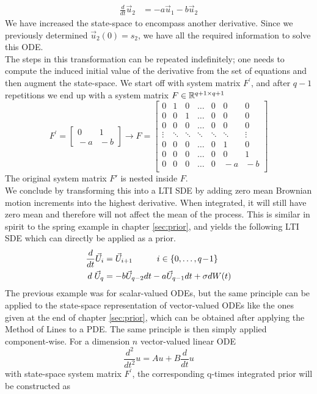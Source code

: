 {\begin{align}
    \frac{d}{dt}\vec{u}_2 &= -a\vec{u}_{1} - b\vec{u}_{2}
\end{align}
We have increased the state-space to encompass another derivative. Since we previously determined $\vec{u}_2(0) = s_2$, we have all the required information to solve this ODE.
\\ The steps in this transformation can be repeated indefinitely; one needs to compute the induced initial value of the derivative from the set of equations and then augment the state-space.
We start off with system matrix $F^\prime$, and after $q-1$ repetitions we end up with a system matrix $F\in\mathbb{R}^{q+1\times q+1}$ 
$$F^\prime\!\! =\! \begin{bmatrix}
0 & 1 \\  \!-a & \!-b
\end{bmatrix} \to F =\! \begin{bmatrix}
0 & 1 & 0 & \!\!\dots\!\! & 0 & 0 & 0 \\
0 & 0 & 1 & \!\!\dots\!\! & 0 & 0 & 0 \\
0 & 0 & 0 & \!\!\dots\!\! & 0 & 0 & 0 \\
\vdots & \!\!\ddots\!\! & \!\!\ddots\!\! & \!\!\ddots\!\! & \!\!\ddots\!\! & \!\!\ddots\!\! & \vdots \\
0 & 0 & 0 & \!\!\dots\!\! & 0 & 1 & 0 \\
0 & 0 & 0 & \!\!\dots\!\! & 0 & 0 & 1 \\
0 & 0 & 0 & \!\!\dots\!\! & 0 & \!\!-a & \!\!\!\!-b \\
\end{bmatrix}$$
The original system matrix $F'$ is nested inside $F$. \\
We conclude by transforming this into a LTI SDE by adding zero mean Brownian motion increments into the highest derivative. When integrated, it will still have zero mean and therefore will not affect the mean of the process. This is similar in spirit to the spring example in chapter \ref{sec:prior}, and yields the following LTI SDE which can directly be applied as a prior.
\begin{align*}
    \frac{d}{dt}\vec{U}_i &= \vec{U}_{i+1} \hspace{10mm} i \in \{0, \dots, q\!-\!1\}
    \\d\;\vec{U}_q &= -b\vec{U}_{q-2}dt - a\vec{U}_{q-1}dt + \sigma dW(t)
\end{align*}
}
\noindent
The previous example was for scalar-valued ODEs, but the same principle can be applied to the state-space representation of vector-valued ODEs like the ones given at the end of chapter \ref{sec:prior}, which can be obtained after applying the Method of Lines to a PDE. The same principle is then simply applied component-wise. For a dimension $n$ vector-valued linear ODE $$\frac{d^2}{dt^2}u = Au + B\frac{d}{dt}u$$ with state-space system matrix $F^\prime$, the corresponding q-times integrated prior will be constructed as
